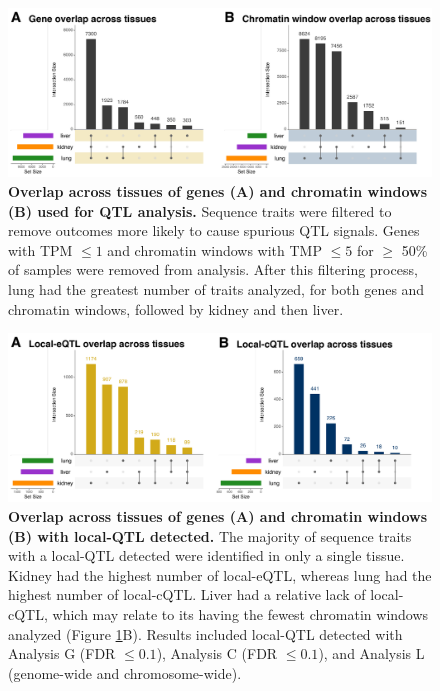 \documentclass[10pt,letterpaper,twoside]{article}
\begin{document}
\clearpage

\begin{figure}[hp]
\renewcommand{\familydefault}{\sfdefault}\normalfont
\centering
\includegraphics[width=\textwidth, trim={0in 0in 0in 0in}, clip]{figs/upset_genes_chromatin.pdf}
\caption{\textbf{Overlap across tissues of genes (A) and chromatin windows (B) used for QTL analysis.} 
Sequence traits were filtered to remove outcomes more likely to cause spurious QTL signals. Genes with TPM $\le 1$ and chromatin windows with TMP $\le 5$ for $\ge$ 50\% of samples were removed from analysis. After this filtering process, lung had the greatest number of traits analyzed, for both genes and chromatin windows, followed by kidney and then liver. 
\label{fig:upset_genes_chromatin}}
\end{figure}

\clearpage

\begin{figure}[hp]
\renewcommand{\familydefault}{\sfdefault}\normalfont
\centering
\includegraphics[width=\textwidth, trim={0in 0in 0in 0in}, clip]{figs/upset_eqtl_cqtl.pdf}
\caption{\textbf{Overlap across tissues of genes (A) and chromatin windows (B) with local-QTL detected.} 
The majority of sequence traits with a local-QTL detected were identified in only a single tissue. Kidney had the highest number of local-eQTL, whereas lung had the highest number of local-cQTL. Liver had a relative lack of local-cQTL, which may relate to its having the fewest chromatin windows analyzed (Figure \ref{fig:upset_genes_chromatin}B). Results included local-QTL detected with Analysis G (FDR $\le 0.1$), Analysis C (FDR $\le 0.1$), and Analysis L (genome-wide and chromosome-wide). 
\label{fig:upset_eqtl_cqtl}}
\end{figure}
\end{document}
